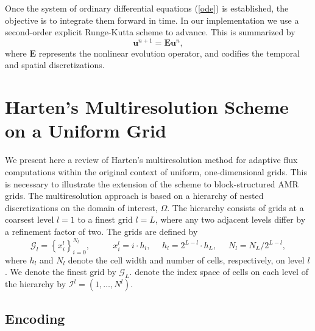 \documentclass[12pt,letterpaper]{article}
\begin{document}
        Once the system of ordinary differential equations (\ref{ode}) is
        established, the objective is to integrate them forward in time. In our
        implementation we use a second-order explicit Runge-Kutta scheme to
        advance. This is summarized by
        \begin{equation}
            \bm{u}^{n+1} = \bm{E} \bm{u}^{n},
        \end{equation}
        where $\bm{E}$ represents the nonlinear evolution operator, and codifies the
        temporal and spatial discretizations.

\section{Harten's Multiresolution Scheme on a Uniform Grid}

    We present here a review of Harten's multiresolution method for adaptive
    flux computations within the original context of uniform, one-dimensional
    grids. This is necessary to illustrate the extension of the scheme to
    block-structured AMR grids. The multiresolution approach is based on a
    hierarchy of nested discretizations on the domain of interest, $\Omega$.
    The hierarchy consists of grids at a coarsest level $l=1$ to a finest grid
    $l=L$, where any two adjacent levels differ by a refinement factor of two.
    The grids are defined by
    \begin{equation}
        \bm{\mathcal{G}}_{l} = \left\{ x_{i}^{l} \right\}_{i=0}^{N_{l}}, \text{ }
        \text{ } \text{ } \text{ } x_{i}^{l} = i \cdot h_{l}, \text{ }
        \text{ } h_{l} = 2^{L-l} \cdot h_{L}, \text{ } \text{ } N_{l} = N_{L}
        / 2^{L-l},
    \end{equation}
    where $h_{l}$ and $N_{l}$ denote the cell width and number of cells,
    respectively, on level $l$. We denote the finest grid by
    $\bm{\mathcal{G}}_{L}$. denote the index space of cells on each level
    of the hierarchy by $\bm{\mathcal{I}}^{l} = (1,\dots,N^{l})$.

    \subsection*{Encoding}
\end{document}
